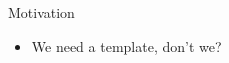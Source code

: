 \begin{frame}{Motivation}
    \begin{itemize}
        \item We need a template, don't we?
    \end{itemize}
\end{frame}